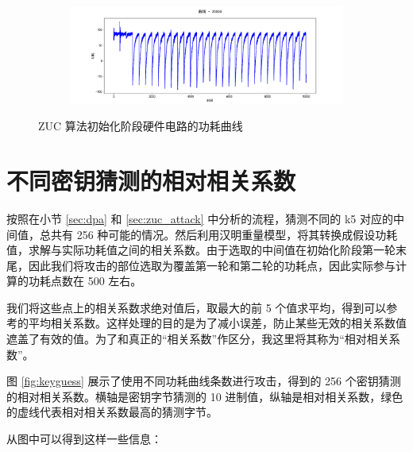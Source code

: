 \begin{figure}[htbp]
\begin{subfigure}{1.0\textwidth}
    \end{subfigure}
    \begin{subfigure}{1.0\textwidth}
        \includegraphics[height=.17\textheight, width=1.0\textwidth]{../images/trace_20000.png}
    \end{subfigure}

    \caption{ZUC 算法初始化阶段硬件电路的功耗曲线}

    \label{fig:traces}

\end{figure}

\newpage

\section{不同密钥猜测的相对相关系数}

按照在小节 \ref{sec:dpa} 和 \ref{sec:zuc_attack} 中分析的流程，猜测不同的 k5 对应的中间值，总共有 256 种可能的情况。然后利用汉明重量模型，将其转换成假设功耗值，求解与实际功耗值之间的相关系数。由于选取的中间值在初始化阶段第一轮末尾，因此我们将攻击的部位选取为覆盖第一轮和第二轮的功耗点，因此实际参与计算的功耗点数在 500 左右。

我们将这些点上的相关系数求绝对值后，取最大的前 5 个值求平均，得到可以参考的平均相关系数。这样处理的目的是为了减小误差，防止某些无效的相关系数值遮盖了有效的值。为了和真正的“相关系数”作区分，我这里将其称为“相对相关系数”。

\vspace*{\baselineskip}

图 \ref{fig:keyguess} 展示了使用不同功耗曲线条数进行攻击，得到的 256 个密钥猜测的相对相关系数。横轴是密钥字节猜测的 10 进制值，纵轴是相对相关系数，绿色的虚线代表相对相关系数最高的猜测字节。

从图中可以得到这样一些信息：

